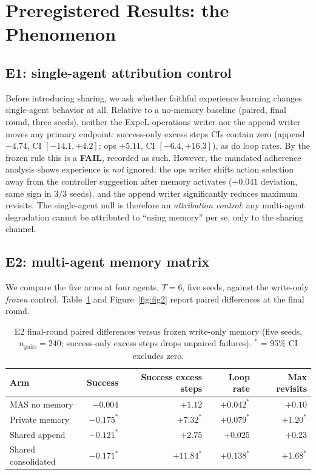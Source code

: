 \documentclass[11pt]{article}
\begin{document}
\section{Preregistered Results: the Phenomenon}\label{sec:beta}

\subsection{E1: single-agent attribution control}

Before introducing sharing, we ask whether faithful experience learning changes single-agent
behavior at all. Relative to a no-memory baseline (paired, final round, three seeds), neither
the ExpeL-operations writer nor the append writer moves any primary endpoint: success-only
excess steps CIs contain zero (append $-4.74$, CI $[-14.1, +4.2]$; ops $+5.11$, CI
$[-6.4, +16.3]$), as do loop rates. By the frozen rule this is a \textbf{FAIL}, recorded as
such. However, the mandated adherence analysis shows experience is \emph{not} ignored: the ops
writer shifts action selection away from the controller suggestion after memory activates
($+0.041$ deviation, same sign in $3/3$ seeds), and the append writer significantly reduces
maximum revisits. The single-agent null is therefore an \emph{attribution control}: any
multi-agent degradation cannot be attributed to ``using memory'' per se, only to the sharing
channel.

\subsection{E2: multi-agent memory matrix}

We compare the five arms at four agents, $T{=}6$, five seeds, against the write-only
\emph{frozen} control. Table~\ref{tab:e2} and Figure~\ref{fig:fig2} report paired differences
at the final round.

\begin{table}[h]
\centering
\caption{E2 final-round paired differences versus frozen write-only memory (five seeds,
$n_{\text{pairs}}=240$; success-only excess steps drops unpaired failures).
$^\ast$ = 95\% CI excludes zero.}
\label{tab:e2}
\begin{tabular}{lrrrr}
\toprule
Arm & Success & Success excess steps & Loop rate & Max revisits \\
\midrule
MAS no memory      & $-0.004$          & $+1.12$            & $+0.042^\ast$ & $+0.10$ \\
Private memory     & $-0.175^\ast$     & $+7.32^\ast$       & $+0.079^\ast$ & $+1.20^\ast$ \\
Shared append      & $-0.121^\ast$     & $+2.75$            & $+0.025$      & $+0.23$ \\
Shared consolidated& $-0.171^\ast$     & $+11.84^\ast$      & $+0.138^\ast$ & $+1.68^\ast$ \\
\bottomrule
\end{tabular}
\end{table}
\end{document}
